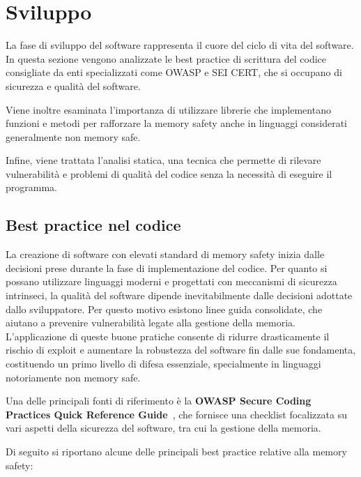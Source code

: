 \section{Sviluppo}
\label{sec:development}

La fase di sviluppo del software rappresenta il cuore del ciclo di vita del software.
In questa sezione vengono analizzate le best practice di scrittura del codice
consigliate da enti specializzati come OWASP e SEI CERT, che si occupano di sicurezza
e qualità del software.

Viene inoltre esaminata l'importanza di utilizzare librerie che implementano funzioni
e metodi per rafforzare la memory safety anche in linguaggi considerati generalmente
non memory safe.

Infine, viene trattata l'analisi statica, una tecnica che permette di
rilevare vulnerabilità e problemi di qualità del codice senza la necessità di eseguire
il programma.

\subsection{Best practice nel codice}
\label{sec:best-practices-codice}

La creazione di software con elevati standard di memory safety inizia dalle
decisioni prese durante la fase di implementazione del codice. Per quanto si possano
utilizzare linguaggi moderni e progettati con meccanismi di sicurezza intrinseci,
la qualità del software dipende inevitabilmente dalle decisioni adottate dallo
sviluppatore. Per questo motivo esistono linee guida consolidate, che aiutano a
prevenire vulnerabilità legate alla gestione della memoria. L'applicazione di queste
buone pratiche consente di ridurre drasticamente il rischio di exploit e aumentare
la robustezza del software fin dalle sue fondamenta, costituendo un primo
livello di difesa essenziale, specialmente in linguaggi notoriamente non memory safe.

Una delle principali fonti di riferimento è la \textbf{OWASP Secure Coding
Practices Quick Reference Guide}~\cite{owasp_best_practices}, che fornisce una checklist
focalizzata su vari aspetti della sicurezza del software, tra cui la gestione
della memoria.

Di seguito si riportano alcune delle principali best practice relative alla
memory safety:

